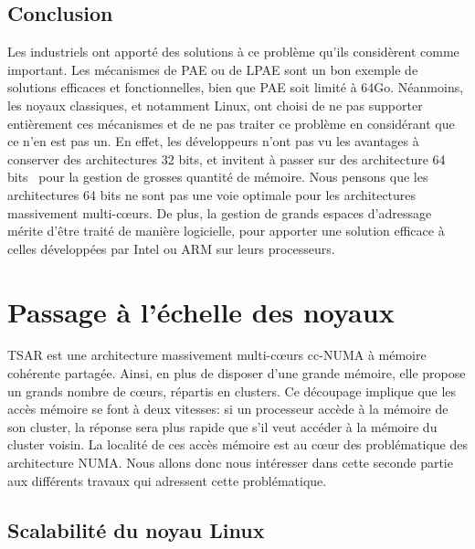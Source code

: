     \subsection{Conclusion}

      Les industriels ont apporté des solutions à ce problème qu'ils
      considèrent comme important. Les mécanismes de PAE ou de LPAE sont un bon
      exemple de solutions efficaces et fonctionnelles, bien que PAE soit limité
      à 64Go. Néanmoins, les noyaux classiques, et notamment Linux, ont choisi
      de ne pas supporter entièrement ces mécanismes et de ne pas traiter ce
      problème en considérant que ce n'en est pas un. En effet, les développeurs
      n'ont pas vu les avantages à conserver des architectures 32 bits, et
      invitent à passer sur des architecture 64
      bits~\citep{gorman2004understanding} pour la gestion de grosses quantité
      de mémoire. Nous pensons que les architectures 64 bits ne sont pas une
      voie optimale pour les architectures massivement multi-c\oe urs. De plus,
      la gestion de grands espaces d'adressage mérite d'être traité de manière
      logicielle, pour apporter une solution efficace à celles développées par
      Intel ou ARM sur leurs processeurs.

  
  \section{Passage à l’échelle des noyaux}
  \label{sec:scalability}

    TSAR est une architecture massivement multi-c\oe urs cc-NUMA à mémoire
    cohérente partagée. Ainsi, en plus de disposer d'une grande mémoire, elle
    propose un grands nombre de c\oe urs, répartis en clusters. Ce découpage
    implique que les accès mémoire se font à deux vitesses: si un processeur
    accède à la mémoire de son cluster, la réponse sera plus rapide que s'il
    veut accéder à la mémoire du cluster voisin. La localité de ces accès
    mémoire est au c\oe ur des problématique des architecture NUMA. Nous allons
    donc nous intéresser dans cette seconde partie aux différents travaux qui
    adressent cette problématique.


    \subsection{Scalabilité du noyau Linux}

